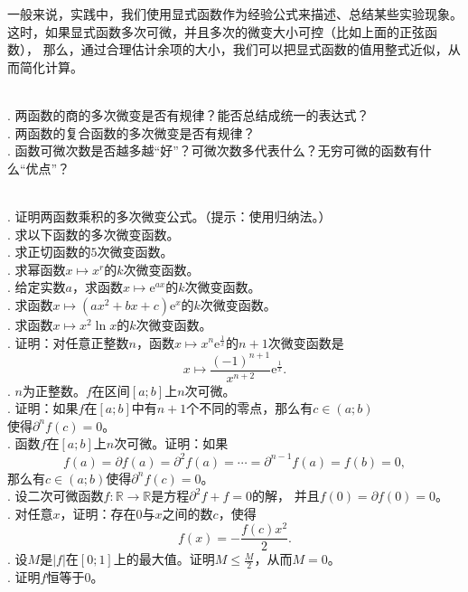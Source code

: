 \documentclass[12pt,UTF8]{ctexbook}
\begin{document}
一般来说，实践中，我们使用显式函数作为经验公式来描述、总结某些实验现象。
这时，如果显式函数多次可微，并且多次的微变大小可控（比如上面的正弦函数），
那么，通过合理估计余项的大小，我们可以把显式函数的值用整式近似，从而简化计算。

\begin{sk}
    \mbox{} \\
    . 两函数的商的多次微变是否有规律？能否总结成统一的表达式？\\
    . 两函数的复合函数的多次微变是否有规律？\\
    . 函数可微次数是否越多越“好”？可微次数多代表什么？无穷可微的函数有什么“优点”？
\end{sk}

\begin{xt}
    \mbox{} \\
    . 证明两函数乘积的多次微变公式。（提示：使用归纳法。）\\
    . 求以下函数的多次微变函数。\\
    . 求正切函数的$5$次微变函数。\\
    . 求幂函数$x\mapsto x^r$的$k$次微变函数。\\
    . 给定实数$a$，求函数$x\mapsto \mathrm{e}^{ax}$的$k$次微变函数。\\
    . 求函数$x \mapsto (ax^2 + bx + c)\mathrm{e}^x$的$k$次微变函数。\\
    . 求函数$x \mapsto x^2\ln{x}$的$k$次微变函数。\\
    . 证明：对任意正整数$n$，函数$x\mapsto x^n \mathrm{e}^{\frac{1}{x}}$的$n+1$次微变函数是
    $$x\mapsto \frac{(-1)^{n+1}}{x^{n+2}}\mathrm{e}^{\frac{1}{x}}.$$
    . $n$为正整数。$f$在区间$[a; b]$上$n$次可微。\\
    . 证明：如果$f$在$[a; b]$中有$n+1$个不同的零点，那么有$c\in(a; b)$\\
    \indent 使得$\partial^n f(c) = 0$。\\
    . 函数$f$在$[a; b]$上$n$次可微。证明：如果
    $$f(a) = \partial f(a) = \partial^2 f(a) = \cdots = \partial^{n-1} f(a) = f(b) = 0,$$
    \indent 那么有$c\in(a; b)$使得$\partial^n f(c) = 0$。\\
    . 设二次可微函数$f:\mathbb{R} \rightarrow \mathbb{R}$是方程$\partial^2 f + f = 0$的解，
    并且$f(0) = \partial f(0) = 0$。\\
    . 对任意$x$，证明：存在$0$与$x$之间的数$c$，使得
    $$ f(x) = -\frac{f(c)x^2}{2}. $$
    . 设$M$是$|f|$在$[0;1]$上的最大值。证明$M \leqslant \frac{M}{2}$，从而$M = 0$。\\
    . 证明$f$恒等于$0$。\\
\end{xt}
\end{document}

